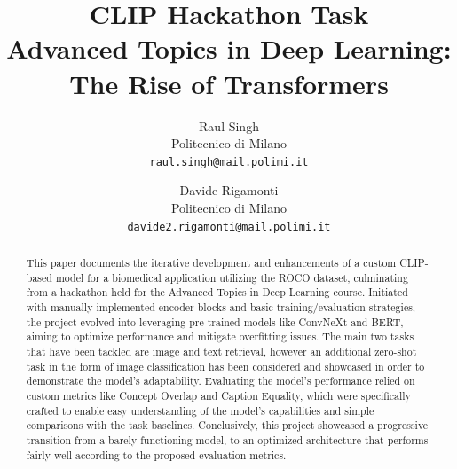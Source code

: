 \documentclass[10pt,twocolumn,letterpaper]{article}
\begin{document}
\title{CLIP Hackathon Task \\ \normalsize\bfseries Advanced Topics in Deep Learning: The Rise of Transformers}

\author{Raul Singh\\
Politecnico di Milano\\
{\tt\small raul.singh@mail.polimi.it}
\and
Davide Rigamonti\\
Politecnico di Milano\\
{\tt\small davide2.rigamonti@mail.polimi.it}
}

\maketitle

\begin{abstract}
This paper documents the iterative development and enhancements of a custom CLIP-based model for a biomedical application utilizing the ROCO dataset, culminating from a hackathon held for the Advanced Topics in Deep Learning course.
Initiated with manually implemented encoder blocks and basic training/evaluation strategies, the project evolved into leveraging pre-trained models like ConvNeXt and BERT, aiming to optimize performance and mitigate overfitting issues.
The main two tasks that have been tackled are image and text retrieval, however an additional zero-shot task in the form of image classification has been considered and showcased in order to demonstrate the model's adaptability.
Evaluating the model's performance relied on custom metrics like Concept Overlap and Caption Equality, which were specifically crafted to enable easy understanding of the model's capabilities and simple comparisons with the task baselines. 
Conclusively, this project showcased a progressive transition from a barely functioning model, to an optimized architecture that performs fairly well according to the proposed evaluation metrics.
\end{abstract}
\end{document}
